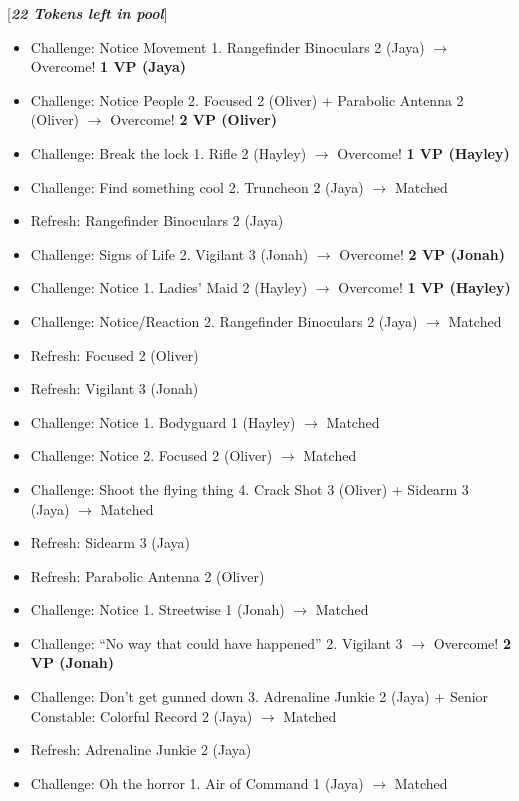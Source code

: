 {[}\textit{\textbf{22 Tokens left in pool}}{]}


{
\parskip=0pt

\begin{itemize}
\item Challenge: Notice Movement 1.  Rangefinder Binoculars 2 (Jaya) $\rightarrow$ Overcome! \textbf{1 VP (Jaya)}
\item Challenge: Notice People 2.  Focused 2 (Oliver) + Parabolic Antenna 2 (Oliver) $\rightarrow$ Overcome! \textbf{2 VP (Oliver)}
\item Challenge: Break the lock 1.  Rifle 2 (Hayley) $\rightarrow$ Overcome! \textbf{1 VP (Hayley)}
\item Challenge: Find something cool 2. Truncheon 2 (Jaya) $\rightarrow$  Matched
\item Refresh: Rangefinder Binoculars 2 (Jaya)
\item Challenge: Signs of Life 2.  Vigilant 3 (Jonah) $\rightarrow$ Overcome! \textbf{2 VP (Jonah)}
\item Challenge: Notice 1.  Ladies' Maid 2 (Hayley) $\rightarrow$ Overcome! \textbf{1 VP (Hayley)}
\item Challenge: Notice/Reaction 2.  Rangefinder Binoculars 2 (Jaya) $\rightarrow$ Matched
\item Refresh: Focused 2 (Oliver)
\item Refresh: Vigilant 3 (Jonah)
\item Challenge: Notice 1. Bodyguard 1 (Hayley) $\rightarrow$ Matched
\item Challenge: Notice 2. Focused 2 (Oliver) $\rightarrow$ Matched
\item Challenge: Shoot the flying thing 4.  Crack Shot 3 (Oliver) + Sidearm 3 (Jaya) $\rightarrow$ Matched
\item Refresh: Sidearm 3 (Jaya)
\item Refresh: Parabolic Antenna 2 (Oliver)
\item Challenge: Notice 1. Streetwise 1 (Jonah) $\rightarrow$ Matched
\item Challenge: ``No way that could have happened'' 2. Vigilant 3 $\rightarrow$ Overcome! \textbf{2 VP (Jonah)}
\item Challenge: Don't get gunned down 3. Adrenaline Junkie 2 (Jaya) + Senior Constable: Colorful Record 2 (Jaya) $\rightarrow$ Matched
\item Refresh: Adrenaline Junkie 2 (Jaya)
\item Challenge: Oh the horror 1.  Air of Command 1 (Jaya) $\rightarrow$ Matched

\end{itemize}}
